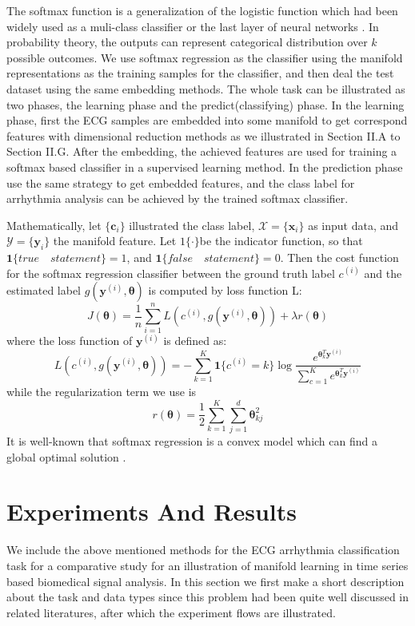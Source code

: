 \documentclass[journal]{IEEEtran}
\begin{document}
The softmax function is a generalization of the logistic function which had been widely used as a muli-class classifier or the last layer of neural networks \cite{christopher2006pattern}.
In probability theory, the outputs can represent categorical distribution over $k$ possible outcomes.
We use softmax regression as the classifier using the manifold representations as the training samples for the classifier, and then deal the test dataset using the same embedding methods.
The whole task can be illustrated as two phases, the learning phase and the predict(classifying) phase.
In the learning phase, first the ECG samples are embedded into some manifold to get correspond features with dimensional reduction methods as we illustrated in Section II.A to Section II.G.
After the embedding, the achieved  features are used for training a softmax based classifier in a supervised learning method. 
In the prediction phase use the same strategy to get embedded features, and the class label for arrhythmia analysis can be achieved by the trained softmax classifier.
 
Mathematically, let $\{\bm{c}_i\}$ illustrated the class label, $\mathcal{X} = \{\bm{x}_i\}$ as input data, and  $\mathcal{Y} = \{\bm{y}_i\}$ the manifold feature.
Let $1\{\cdot\}$be the indicator function, so that $\bm{1}\{true \quad statement\} = 1$, and $\bm{1}\{false \quad statement\} = 0$. 
Then the cost function for the softmax regression classifier between the ground truth label $c^{(i)}$ and the estimated label $g(\bm{y}^{(i)}, \bm{\theta})$ is computed by loss function L:
\begin{equation}
J(\bm{\theta}) = \frac{1}{n}\sum_{i=1}^nL(c^{(i)}, g(\bm{y}^{(i)}, \bm{\theta})) + \lambda r(\bm{\theta})
\end{equation}
where the loss function of $\bm{y}^{(i)}$ is defined as:
\begin{equation}
L(c^{(i)}, g(\bm{y}^{(i)}, \bm{\theta})) = -\sum_{k=1}^K\bm{1}\{c^{(i)} = k\} \log \frac{e^{\bm{\theta}_k^T\bm{y}^{(i)}}}{\sum_{c=1}^Ke^{\bm{\theta}_k^T\bm{y}^{(i)}} }
\end{equation}
while the regularization term we use is
\begin{equation}
r(\bm{\theta}) = \frac{1}{2} \sum_{k=1}^K\sum_{j=1}^d \bm{\theta}_{kj}^2
\end{equation}
It is well-known that softmax regression is a convex model which can find a global optimal solution \cite{ren2017robust}.



\section{Experiments And Results}
We include the above mentioned methods for the ECG arrhythmia classification task for a comparative study for an illustration of manifold learning in time series based biomedical signal analysis.
In this section we first make a short description about the task and data types since this problem had been quite well discussed in related literatures, after which the experiment flows are illustrated.
\end{document}
